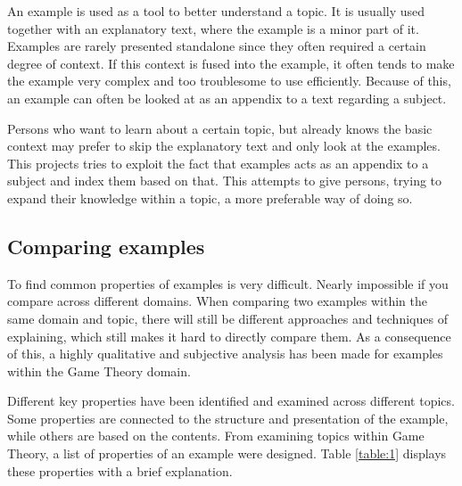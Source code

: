 An example is used as a tool to better understand a topic. It is usually used together with an explanatory text, where the example is a minor part of it. Examples are rarely presented standalone since they often required a certain degree of context. If this context is fused into the example, it often tends to make the example very complex and too troublesome to use efficiently. Because of this, an example can often be looked at as an appendix to a text regarding a subject. 


Persons who want to learn about a certain topic, but already knows the basic context may prefer to skip the explanatory text and only look at the examples. This projects tries to exploit the fact that examples acts as an appendix to a subject and index them based on that. This attempts to give persons, trying to expand their knowledge within a topic, a more preferable way of doing so.

\subsection{Comparing examples} \label{comparing_examples}

To find common properties of examples is very difficult. Nearly impossible if you compare across different domains. When comparing two examples within the same domain and topic, there will still be different approaches and techniques of explaining, which still makes it hard to directly compare them. As a consequence of this, a highly qualitative and subjective analysis has been made for examples within the Game Theory domain. 

Different key properties have been identified and examined across different topics. Some properties are connected to the structure and presentation of the example, while others are based on the contents. From examining topics within Game Theory, a list of properties of an example were designed. Table \ref{table:1} displays these properties with a brief explanation.

